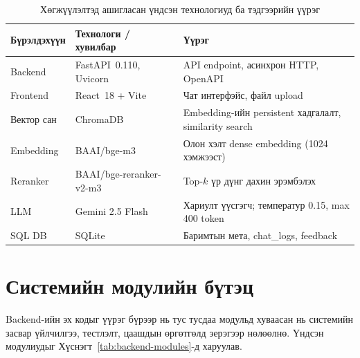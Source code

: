 \begin{table}[H]
\centering
\begin{tabular}{|p{3.6cm}|p{3.6cm}|p{6.8cm}|}
\hline
\textbf{Бүрэлдэхүүн} & \textbf{Технологи / хувилбар} & \textbf{Үүрэг} \\ \hline
Backend & FastAPI~0.110, Uvicorn~\cite{fastapi} & API endpoint, асинхрон HTTP, OpenAPI \\ \hline
Frontend & React~18 + Vite~\cite{react_docs,vite_docs} & Чат интерфэйс, файл upload \\ \hline
Вектор сан & ChromaDB~\cite{chromadb} & Embedding-ийн persistent хадгалалт, similarity search \\ \hline
Embedding & BAAI/bge-m3~\cite{bge_m3} & Олон хэлт dense embedding (1024 хэмжээст) \\ \hline
Reranker & BAAI/bge-reranker-v2-m3~\cite{bge_reranker} & Top-$k$ үр дүнг дахин эрэмбэлэх \\ \hline
LLM & Gemini 2.5 Flash~\cite{gemini_api} & Хариулт үүсгэгч; температур 0.15, max 400 token \\ \hline
SQL DB & SQLite~\cite{sqlite} & Баримтын мета, chat\_logs, feedback \\ \hline
\end{tabular}
\caption[Хөгжүүлэлтэд ашигласан технологи]{Хөгжүүлэлтэд ашигласан үндсэн технологиуд ба тэдгээрийн үүрэг}
\label{tab:dev-stack}
\end{table}


\section{Системийн модулийн бүтэц}

Backend-ийн эх кодыг үүрэг бүрээр нь тус тусдаа модульд хуваасан нь системийн засвар үйлчилгээ, тестлэлт, цаашдын өргөтгөлд эерэгээр нөлөөлнө. Үндсэн модулиудыг Хүснэгт~\ref{tab:backend-modules}-д харуулав.

